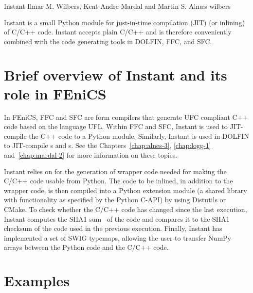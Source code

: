               {Instant}
              {Ilmar M. Wilbers, Kent-Andre Mardal and Martin S. Aln{\ae}s}
              {wilbers}

Instant is a small Python module for just-in-time compilation
(JIT) (or inlining) of C/C++ code.  Instant accepts plain
C/C++ and is therefore conveniently combined with the code generating
tools in DOLFIN, FFC, and SFC.

\section{Brief overview of Instant and its role in FEniCS}

In FEniCS, FFC and SFC are form compilers that generate UFC compliant C++
code based on the language UFL.  Within FFC and SFC, Instant is used to
JIT-compile the C++ code to a Python module.  Similarly, Instant is used
in DOLFIN to JIT-compile s and s.  See the
Chapters~\ref{chap:alnes-3}, \ref{chap:logg-1} and~\ref{chap:mardal-2}
for more information on these topics.

Instant relies on \citet{www:swig,Beazley2006} for the generation of
wrapper code needed for making the C/C++ code usable from Python.  The
code to be inlined, in addition to the wrapper code, is then compiled
into a Python extension module (a shared library with functionality as
specified by the Python C-API) by using Distutils or CMake. To check
whether the C/C++ code has changed since the last execution, Instant
computes the SHA1 sum~\citep{HansenWollman} of the code and compares
it to the SHA1 checksum of the code used in the previous
execution. Finally, Instant has implemented a set of
SWIG typemaps, allowing the user to transfer NumPy
arrays between the Python code and the C/C++ code.

\section{Examples}

\label{wilbers:sec:examples}
